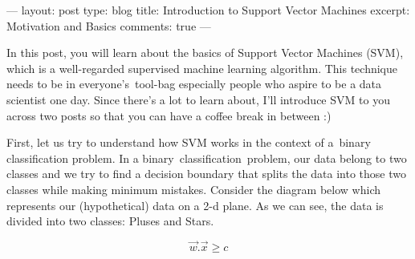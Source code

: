 ---
layout: post
type: blog
title: Introduction to Support Vector Machines
excerpt: Motivation and Basics
comments: true
---

In this post, you will learn about the basics of Support Vector Machines (SVM), which is a well-regarded supervised machine learning algorithm. This technique needs to be in everyone's tool-bag especially people who aspire to be a data scientist one day. Since there's a lot to learn about, I'll introduce SVM to you across two posts so that you can have a coffee break in between :)

First, let us try to understand how SVM works in the context of a binary classification problem. In a binary classification problem, our data belong to two classes and we try to find a decision boundary that splits the data into those two classes while making minimum mistakes. Consider the diagram below which represents our (hypothetical) data on a 2-d plane. As we can see, the data is divided into two classes: Pluses and Stars.

$$ \vec{w} . \vec{x} \ge c$$

